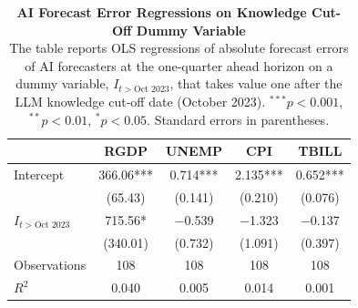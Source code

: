 \documentclass[11pt,letterpaper]{scrartcl}
\begin{document}
\clearpage
\begin{table}[]
    \centering
    \caption{\textbf{AI Forecast Error Regressions on Knowledge Cut-Off Dummy Variable}
    \vspace{10pt}\\
    {\footnotesize 
    The table reports OLS regressions of absolute forecast errors of AI forecasters at the one-quarter ahead horizon on a dummy variable, $I_{t>\text{Oct 2023}}$, that takes value one after the LLM knowledge cut-off date (October 2023). $^{***}p<0.001$, $^{**}p<0.01$, $^{*}p<0.05$. Standard errors in parentheses.}
    }
    \label{tab:cutoff_regressions}
    \footnotesize
    \begin{tabular}{lcccc}
    \toprule
    & RGDP & UNEMP & CPI & TBILL \\
    \hline
    Intercept & 366.06*** & 0.714*** & 2.135*** & 0.652*** \\
    & (65.43) & (0.141) & (0.210) & (0.076) \\
    $I_{t>\text{Oct 2023}}$ & 715.56* & $-$0.539 & $-$1.323 & $-$0.137 \\
    & (340.01) & (0.732) & (1.091) & (0.397) \\
    \hline
    Observations & 108 & 108 & 108 & 108 \\
    $R^2$ & 0.040 & 0.005 & 0.014 & 0.001 \\
    \bottomrule
    \end{tabular}
\end{table}

\end{document}
